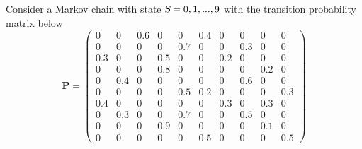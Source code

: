 \documentclass[answers]{exam}
\begin{document}
\begin{questions}

    \question Consider a Markov chain with state $\textsl{S} = 0, 1, ... , 9$ with the transition probability matrix below
    $$\mathbf{P}=\left(\begin{array}{cccccccccc}0 & 0 & 0.6 & 0 & 0 & 0.4 & 0 & 0 & 0 & 0 \\ 0 & 0 & 0 & 0 & 0.7 & 0 & 0 & 0.3 & 0 & 0 \\ 0.3 & 0 & 0 & 0.5 & 0 & 0 & 0.2 & 0 & 0 & 0 \\ 0 & 0 & 0 & 0.8 & 0 & 0 & 0 & 0 & 0.2 & 0 \\ 0 & 0.4 & 0 & 0 & 0 & 0 & 0 & 0.6 & 0 & 0 \\ 0 & 0 & 0 & 0 & 0.5 & 0.2 & 0 & 0 & 0 & 0.3 \\ 0.4 & 0 & 0 & 0 & 0 & 0 & 0.3 & 0 & 0.3 & 0 \\ 0 & 0.3 & 0 & 0 & 0.7 & 0 & 0 & 0.5 & 0 & 0 \\ 0 & 0 & 0 & 0.9 & 0 & 0 & 0 & 0 & 0.1 & 0 \\ 0 & 0 & 0 & 0 & 0 & 0.5 & 0 & 0 & 0 & 0.5\end{array}\right)$$
        \begin{parts}

\end{parts}
\end{questions}
\end{document}
